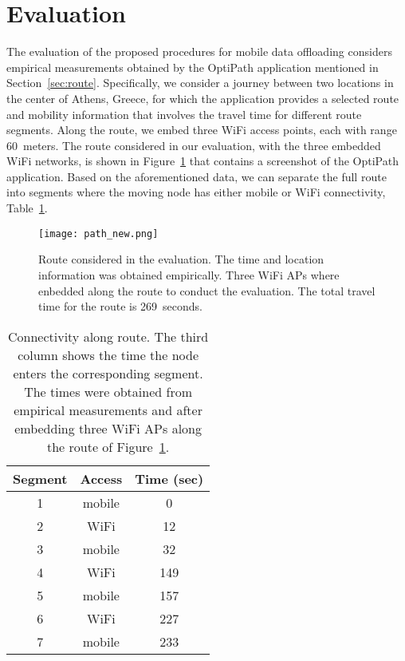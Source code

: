 \documentclass{sig-alternate}
\begin{document}
\section {Evaluation}
\label{sec:evaluation}


The evaluation of the proposed procedures for mobile data offloading considers empirical measurements obtained by the OptiPath application mentioned in Section~\ref{sec:route}. Specifically, we consider a journey between two locations in the center of Athens, Greece, for which the application provides a selected route and mobility information that involves the travel time for different route segments.
Along the route, we embed three WiFi access points, each with range  60~meters. The route considered in our evaluation, with the three embedded  WiFi networks, is shown in Figure~\ref{fig:path} that contains a screenshot of the OptiPath application.
Based on the aforementioned data, we can separate the full route into segments where the moving node has either mobile  or WiFi connectivity, Table~\ref{tab:route_segments}.


\begin{figure}[t]
\centering
\texttt{[image: path\_new.png]}
\caption{\small{Route considered in the evaluation.
The time and location information was obtained empirically. Three WiFi APs where enbedded along the route to conduct the evaluation.
The total travel time for the route is 269~seconds.}}
\label{fig:path}
\end{figure}


\begin{table}[b]
\caption{Connectivity along route. The third column shows the time the node enters the corresponding segment. The times were obtained from empirical measurements and after embedding three WiFi APs  along the route of Figure~\ref{fig:path}.}
    \label{tab:route_segments}
\centering
 {\begin{tabular}{|c|c|c|}
        \hline
        Segment  &  Access &  Time (sec)\\
        \hline \hline
    1 & mobile & 0 \\
    2 & WiFi & 12 \\
    3 & mobile & 32 \\
    4 & WiFi & 149 \\
    5 & mobile & 157 \\
    6 & WiFi & 227 \\
    7 & mobile & 233 \\
        \hline
        \end{tabular}
}
\end{table}
\end{document}
